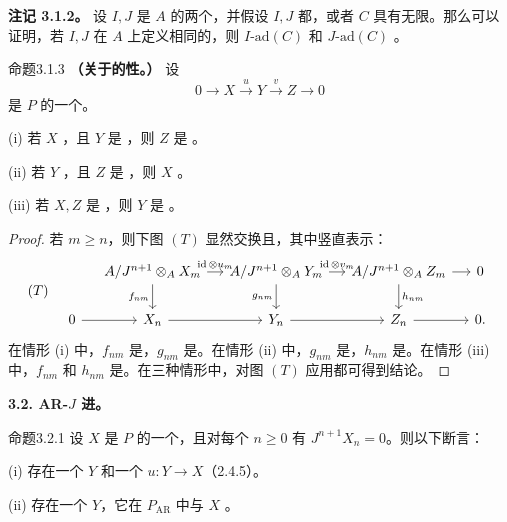 \textbf{注记 3.1.2。} 设 $I,J$ 是 $A$ 的两个，并假设 $I,J$ 都，或者 $C$ 具有无限。那么可以证明，若 $I,J$ 在 $A$ 上定义相同的，则 $I\text{-}\mathrm{ad}(C)$ 和 $J\text{-}\mathrm{ad}(C)$ 。
\begin{SGAresult}{命题}{3.1.3}
\textbf{（关于的性。）} 设
\[
0\longrightarrow X\xrightarrow{u}Y\xrightarrow{v}Z\longrightarrow0
\]
是 $P$ 的一个。

(i) 若 $X$ ，且 $Y$ 是 ，则 $Z$ 是 。

(ii) 若 $Y$ ，且 $Z$ 是 ，则 $X$ 。

(iii) 若 $X,Z$ 是 ，则 $Y$ 是 。
\end{SGAresult}
\begin{proof}若 $m\geq n$，则下图 $(T)$ 显然交换且，其中竖直表示：
\[
(T)\quad\begin{tikzcd}[column sep=small]
&A/J^{n+1}\otimes_A X_m\arrow[r,"\operatorname{id}\otimes u_m"]\arrow[d,"f_{nm}"']&A/J^{n+1}\otimes_A Y_m\arrow[r,"\operatorname{id}\otimes v_m"]\arrow[d,"g_{nm}"']&A/J^{n+1}\otimes_A Z_m\arrow[r]\arrow[d,"h_{nm}"]&0\\
0\arrow[r]&X_n\arrow[r]&Y_n\arrow[r]&Z_n\arrow[r]&0.
\end{tikzcd}
\]
在情形 (i) 中，$f_{nm}$ 是，$g_{nm}$ 是。在情形 (ii) 中，$g_{nm}$ 是，$h_{nm}$ 是。在情形 (iii) 中，$f_{nm}$ 和 $h_{nm}$ 是。在三种情形中，对图 $(T)$ 应用都可得到结论。
\end{proof}
\textbf{3.2. AR-$J$ 进。}
\begin{SGAresult}{命题}{3.2.1}
设 $X$ 是 $P$ 的一个，且对每个 $n\geq0$ 有 $J^{n+1}X_n=0$。则以下断言：

(i) 存在一个  $Y$ 和一个  $u:Y\to X$（2.4.5）。

(ii) 存在一个  $Y$，它在 $P_{\mathrm{AR}}$ 中与 $X$ 。
\end{SGAresult}

